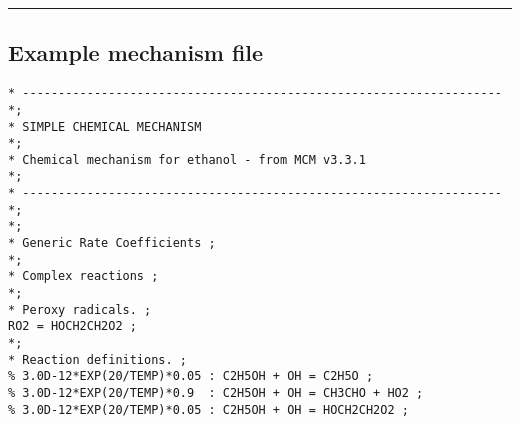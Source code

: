 \begin{center}\rule{0.5\linewidth}{\linethickness}\end{center}

\subsection{Example mechanism file}\label{example-mechanism-file}

\begin{verbatim}
* ------------------------------------------------------------------- *;
* SIMPLE CHEMICAL MECHANISM                                           *;
* Chemical mechanism for ethanol - from MCM v3.3.1                    *;
* ------------------------------------------------------------------- *;
*;
* Generic Rate Coefficients ;
*;
* Complex reactions ;
*;
* Peroxy radicals. ;
RO2 = HOCH2CH2O2 ;
*;
* Reaction definitions. ;
% 3.0D-12*EXP(20/TEMP)*0.05 : C2H5OH + OH = C2H5O ;
% 3.0D-12*EXP(20/TEMP)*0.9  : C2H5OH + OH = CH3CHO + HO2 ;
% 3.0D-12*EXP(20/TEMP)*0.05 : C2H5OH + OH = HOCH2CH2O2 ;
\end{verbatim}
